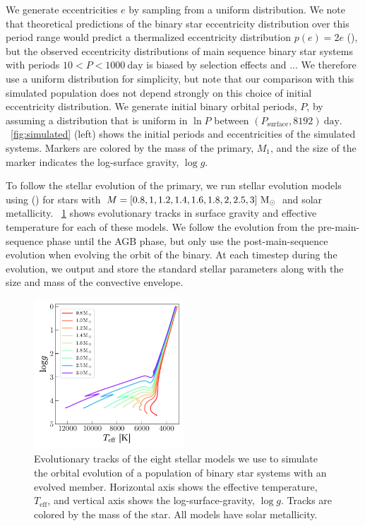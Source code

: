 \documentclass[modern, letterpaper]{aastex62}
\newcommand{\logg}{\ensuremath{\log g}}
\newcommand{\Psurf}{\ensuremath{P_\textrm{surface}}}
\begin{document}
We generate eccentricities $e$ by sampling from a uniform distribution.
We note that theoretical predictions of the binary star eccentricity
distribution over this period range would predict a thermalized eccentricity
distribution $p(e) = 2e$ (\citealt{WHO}), but the observed eccentricity
distributions of main sequence binary star systems with periods $10 < P <
1000~\textrm{day}$ is biased by selection effects and ...
We therefore use a uniform distribution for simplicity, but note that our
comparison with this simulated population does not depend strongly on this
choice of initial eccentricity distribution.
We generate initial binary orbital periods, $P$, by assuming a distribution that
is uniform in $\ln P$ between $(\Psurf, 8192)~\textrm{day}$.
\figurename~\ref{fig:simulated} (left) shows the initial periods and
eccentricities of the simulated systems.
Markers are colored by the mass of the primary, $M_1$, and the size of the
marker indicates the log-surface gravity, \logg.

To follow the stellar evolution of the primary, we run stellar evolution models
using  (\citealt{Paxton:2011}) for stars with $M = [0.8, 1, 1.2,
1.4, 1.6, 1.8, 2, 2.5, 3]~\mathrm{M}_\odot$ and solar metallicity.
\figurename~\ref{fig:mesa} shows evolutionary tracks in surface gravity and
effective temperature for each of these models.
We follow the evolution from the pre-main-sequence phase until the AGB phase,
but only use the post-main-sequence evolution when evolving the orbit of the
binary.
At each timestep during the evolution, we output and store the standard stellar
parameters along with the size and mass of the convective envelope.

\begin{figure}[h]
\begin{center}
\includegraphics[width=0.5\textwidth]{mesa}
\end{center}
\caption{%
Evolutionary tracks of the eight stellar models we use to simulate the orbital
evolution of a population of binary star systems with an evolved member.
Horizontal axis shows the effective temperature, $T_\textrm{eff}$, and vertical
axis shows the log-surface-gravity, \logg.
Tracks are colored by the mass of the star.
All models have solar metallicity.
\label{fig:mesa}
}
\end{figure}
\end{document}
